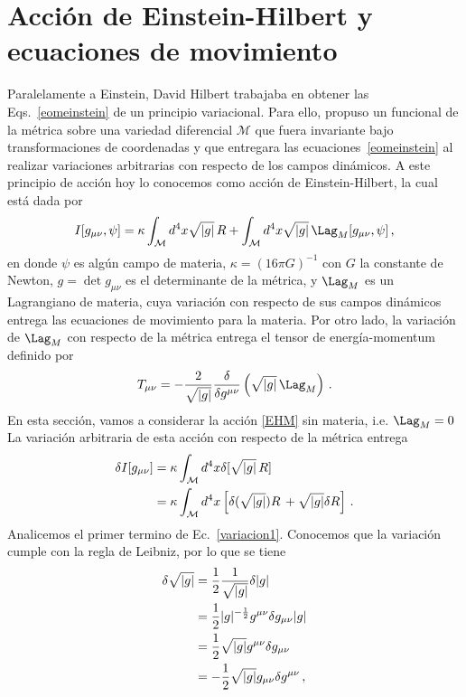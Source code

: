 \documentclass[../Main.tex]{subfiles}
\begin{document}
\section{Acción de Einstein-Hilbert y ecuaciones de movimiento}
Paralelamente a Einstein, David Hilbert trabajaba en obtener las Eqs.~\eqref{eomeinstein} de un principio variacional. Para ello, propuso un funcional de la métrica sobre una variedad diferencial $\mathcal{M}$ que fuera invariante bajo transformaciones de coordenadas y que entregara las ecuaciones~\eqref{eomeinstein} al realizar variaciones arbitrarias con respecto de los campos dinámicos. A este principio de acción hoy lo conocemos como acción de Einstein-Hilbert, la cual está dada por
\begin{equation}\label{EHM}
    I[g_{\mu\nu},\psi]=\kappa \int_{\mathcal{M}} d^{4}x \sqrt{\lvert g\rvert}\, R + \int_{\mathcal{M}}d^{4}x \sqrt{\lvert g\rvert}\, \Lag_M[g_{\mu\nu},\psi] \, , 
\end{equation}
en donde $\psi$ es algún campo de materia, $\kappa=(16\pi G)^{-1}$ con $G$ la constante de Newton, $g=\det g_{\mu\nu}$ es el determinante de la métrica, y $\Lag_M$ es un Lagrangiano de materia, cuya variación con respecto de sus campos dinámicos entrega las ecuaciones de movimiento para la materia. Por otro lado, la variación de $\Lag_M$ con respecto de la métrica entrega el tensor de energía-momentum definido por
\begin{align}
T_{\mu\nu} = -\frac{2}{\sqrt{|g|}}\frac{\delta}{\delta g^{\mu\nu}}\left(\sqrt{|g|}\,\Lag_M\right)\,.
\end{align}
En esta sección, vamos a considerar la acción \eqref{EHM} sin materia, i.e. $\Lag_{M}=0$ La variación arbitraria de esta acción con respecto de la métrica entrega
\begin{align} \notag
     \delta I[g_{\mu\nu}]&=\kappa \int_{\mathcal{M}} d^{4}x \delta[\sqrt{\lvert g\rvert}\, R]\\
     &=\kappa \int_{\mathcal{M}} d^{4}x \left[\delta(\sqrt{\lvert g\rvert})R\,+ \sqrt{\lvert g\rvert}\delta R\right] \, . \label{variacion1}
\end{align}
Analicemos el primer termino de Ec.~\eqref{variacion1}. Conocemos que la variación cumple con la regla de Leibniz, por lo que se tiene
\begin{align} \notag
    \delta\sqrt{\lvert g \rvert}&=\frac{1}{2}\frac{1}{\sqrt{\lvert g \rvert}}\delta \lvert g \rvert\\ \notag
    &=\frac{1}{2}\lvert g \rvert^{-\frac{1}{2}}g^{\mu\nu}\delta g_{\mu\nu}\lvert g \rvert \\ \notag
    &=\frac{1}{2}\sqrt{\lvert g \rvert}g^{\mu\nu}\delta g_{\mu\nu} \, \\ 
    &=-\frac{1}{2}\sqrt{\lvert g \rvert}g_{\mu\nu}\delta g^{\mu\nu} \, ,\label{vd}
\end{align}
\end{document}
